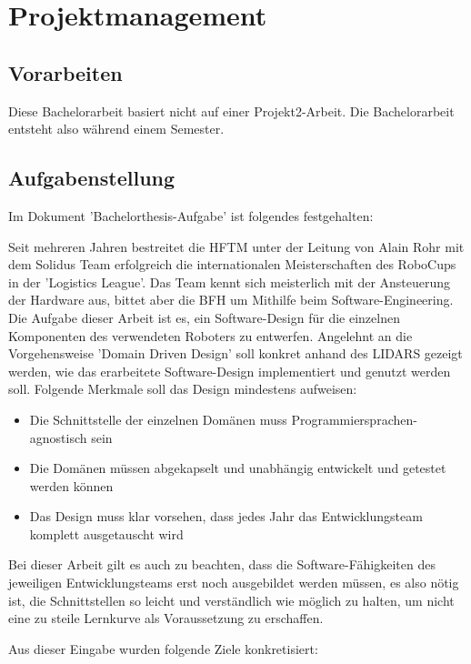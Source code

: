 \chapter{Projektmanagement}
\section{Vorarbeiten}
Diese Bachelorarbeit basiert nicht auf einer Projekt2-Arbeit. Die Bachelorarbeit entsteht also während einem Semester.
\section{Aufgabenstellung}
\label{chap:aufgabenstellung}
Im Dokument 'Bachelorthesis-Aufgabe' ist folgendes festgehalten:
\begin{formal}
	Seit mehreren Jahren bestreitet die HFTM unter der Leitung von Alain Rohr mit dem Solidus Team erfolgreich die internationalen Meisterschaften des RoboCups in der 'Logistics League'.
	Das Team kennt sich meisterlich mit der Ansteuerung der Hardware aus, bittet aber die BFH um Mithilfe beim Software-Engineering.
	Die Aufgabe dieser Arbeit ist es, ein Software-Design für die einzelnen Komponenten des verwendeten Roboters zu entwerfen. Angelehnt an die Vorgehensweise 'Domain Driven Design' soll konkret anhand des LIDARS gezeigt werden, wie das erarbeitete Software-Design implementiert und genutzt werden soll. Folgende Merkmale soll das Design mindestens aufweisen:
	
	\begin{itemize}
		\item Die Schnittstelle der einzelnen Domänen muss Programmiersprachen-agnostisch sein
		\item Die Domänen müssen abgekapselt und unabhängig entwickelt und getestet werden können
		\item Das Design muss klar vorsehen, dass jedes Jahr das Entwicklungsteam komplett ausgetauscht wird
	\end{itemize}
	Bei dieser Arbeit gilt es auch zu beachten, dass die Software-Fähigkeiten des jeweiligen Entwicklungsteams erst noch ausgebildet werden müssen, es also nötig ist, die Schnittstellen so leicht und verständlich wie möglich zu halten, um nicht eine zu steile Lernkurve als Voraussetzung zu erschaffen.
\end{formal}

Aus dieser Eingabe wurden folgende Ziele konkretisiert:
